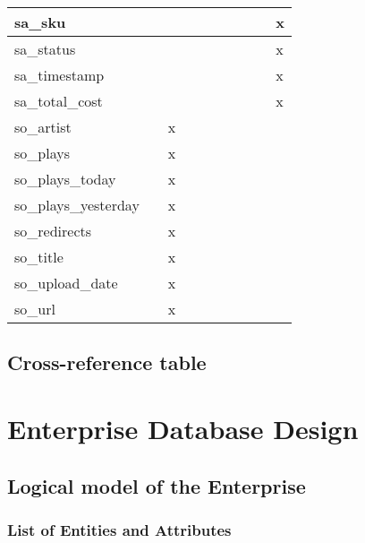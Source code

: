 \documentclass[11pt, a4paper]{report}
\begin{document}
\begin{longtable}{|l|l|l|l|l|l|l|l|l|l|}
sa\_sku                 &                &   &   &   &   &   &   &   & x \\ \hline
sa\_status              &                &   &   &   &   &   &   &   & x \\ \hline
sa\_timestamp           &                &   &   &   &   &   &   &   & x \\ \hline
sa\_total\_cost         &                &   &   &   &   &   &   &   & x \\ \hline
so\_artist              &                & x &   &   &   &   &   &   &   \\ \hline
so\_plays               &                & x &   &   &   &   &   &   &   \\ \hline
so\_plays\_today        &                & x &   &   &   &   &   &   &   \\ \hline
so\_plays\_yesterday    &                & x &   &   &   &   &   &   &   \\ \hline
so\_redirects           &                & x &   &   &   &   &   &   &   \\ \hline
so\_title               &                & x &   &   &   &   &   &   &   \\ \hline
so\_upload\_date        &                & x &   &   &   &   &   &   &   \\ \hline
so\_url                 &                & x &   &   &   &   &   &   &   \\ \hline

\end{longtable}

\section{Cross-reference table}

\chapter{Enterprise Database Design}

\section{Logical model of the Enterprise}
\subsection{List of Entities and Attributes}
\end{document}
